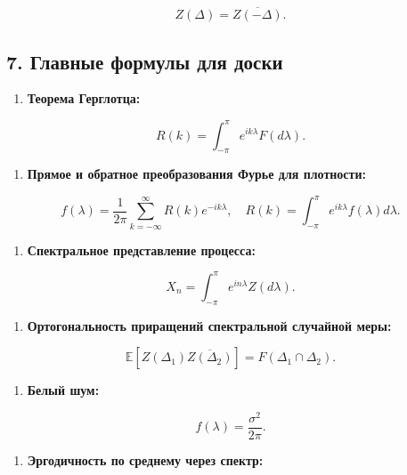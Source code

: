 \documentclass[
  11pt,
  a4paper,
]{article}
\providecommand{\tightlist}{%
  \setlength{\itemsep}{0pt}\setlength{\parskip}{0pt}}
\begin{document}
\[
Z(\Delta) = \overline{Z(-\Delta)}.
\]

\subsection{7. Главные формулы для
доски}\label{ux433ux43bux430ux432ux43dux44bux435-ux444ux43eux440ux43cux443ux43bux44b-ux434ux43bux44f-ux434ux43eux441ux43aux438}

\begin{enumerate}
\def\labelenumi{\arabic{enumi}.}
\tightlist
\item
  \textbf{Теорема Герглотца:}
\end{enumerate}

\[
R(k) = \int_{-\pi}^{\pi} e^{i k \lambda} F(d\lambda).
\]

\begin{enumerate}
\def\labelenumi{\arabic{enumi}.}
\setcounter{enumi}{1}
\tightlist
\item
  \textbf{Прямое и обратное преобразования Фурье для плотности:}
\end{enumerate}

\[
f(\lambda) = \frac{1}{2\pi} \sum_{k=-\infty}^{\infty} R(k) e^{-i k \lambda}, \quad
R(k) = \int_{-\pi}^{\pi} e^{i k \lambda} f(\lambda) d\lambda.
\]

\begin{enumerate}
\def\labelenumi{\arabic{enumi}.}
\setcounter{enumi}{2}
\tightlist
\item
  \textbf{Спектральное представление процесса:}
\end{enumerate}

\[
X_n = \int_{-\pi}^{\pi} e^{i n \lambda} Z(d\lambda).
\]

\begin{enumerate}
\def\labelenumi{\arabic{enumi}.}
\setcounter{enumi}{3}
\tightlist
\item
  \textbf{Ортогональность приращений спектральной случайной меры:}
\end{enumerate}

\[
\mathbb E[Z(\Delta_1) \overline{Z(\Delta_2)}] = F(\Delta_1 \cap \Delta_2).
\]

\begin{enumerate}
\def\labelenumi{\arabic{enumi}.}
\setcounter{enumi}{4}
\tightlist
\item
  \textbf{Белый шум:}
\end{enumerate}

\[
f(\lambda) = \frac{\sigma^2}{2\pi}.
\]

\begin{enumerate}
\def\labelenumi{\arabic{enumi}.}
\setcounter{enumi}{5}
\tightlist
\item
  \textbf{Эргодичность по среднему через спектр:}
\end{enumerate}
\end{document}
